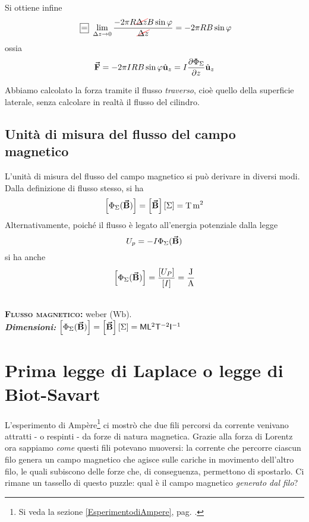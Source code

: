 Si ottiene infine
\begin{equation*}
	\squarequal\lim_{\Delta z\to 0}\frac{-2\pi R \Ccancel[red]{\Delta z} B\sin\phi}{\Ccancel[red]{\Delta z}}=-2\pi R B\sin\phi
\end{equation*}
ossia
\begin{equation}
	\vb*{\va{F}}=-2\pi IRB\sin\varphi\hat{\mathbf{u}}_z=I\pdv{\Phi_{\Sigma}}{z}\hat{\mathbf{u}}_z
\end{equation}
\begin{observe}
	Abbiamo calcolato la forza tramite il flusso \textit{traverso}, cioè quello della superficie laterale, senza calcolare in realtà il flusso del cilindro.
\end{observe} %
\subsection{Unità di misura del flusso del campo magnetico}
L'unità di misura del flusso del campo magnetico si può derivare in diversi modi. Dalla definizione di flusso stesso, si ha
\begin{equation*}
	\left[\Phi_{\Sigma}(\vba{B})\right]=\left[\vba{B}\right]\left[\Sigma\right]=\unit[per-mode = fraction,exponent-product=\ensuremath{\cdot}]{\tesla\meter\squared}
\end{equation*}
Alternativamente, poiché il flusso è legato all'energia potenziale dalla legge
\begin{equation*}
	U_p=-I\Phi_{\Sigma}(\vb*{\va{B}})
\end{equation*}
si ha anche
\begin{equation*}
	\left[\Phi_{\Sigma}(\vba{B})\right]=\frac{\left[U_P\right]}{\left[I\right]}=\unit[per-mode = fraction,exponent-product=\ensuremath{\cdot}]{\joule\per\ampere}
\end{equation*}
\begin{units}~\\
	\textbf{\textsc{Flusso magnetico:}} weber ($\unit{\weber}$).\\
	\textit{\textbf{Dimensioni:}} $\left[\Phi_{\Sigma}(\vb*{\va{B}})\right]=\left[\vb*{\va{B}}\right]\left[\Sigma\right]=\mathsf{M}\mathsf{L}^2 \mathsf{T}^{-2}  \mathsf{I}^{-1}$
\end{units}
\section{Prima legge di Laplace o legge di Biot-Savart}
L'esperimento di Ampère\footnote{Si veda la sezione \ref{EsperimentodiAmpere}, pag. \pageref{EsperimentodiAmpere}.} ci mostrò che due fili percorsi da corrente venivano attratti - o respinti - da forze di natura magnetica. Grazie alla forza di Lorentz ora sappiamo \textit{come} questi fili potevano muoversi: la corrente che percorre ciascun filo genera un campo magnetico che agisce sulle cariche in movimento dell'altro filo, le quali subiscono delle forze che, di conseguenza, permettono di spostarlo. Ci rimane un tassello di questo puzzle: qual è il campo magnetico \textit{generato dal filo}?

